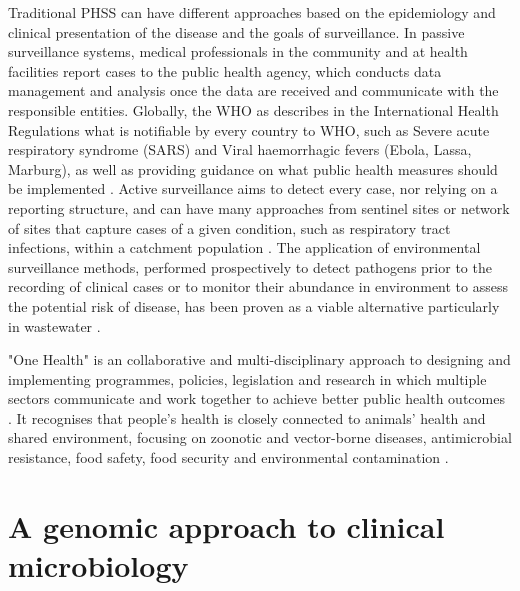 Traditional PHSS can have different approaches based on the epidemiology and clinical presentation of the disease and the goals of surveillance. In passive surveillance systems, medical professionals in the community and at health facilities report cases to the public health agency, which conducts data management and analysis once the data are received and communicate with the responsible entities. Globally, the WHO as describes in the International Health Regulations what is notifiable by every country to WHO, such as Severe acute respiratory syndrome (SARS) and Viral haemorrhagic fevers
(Ebola, Lassa, Marburg), as well as providing guidance on what public health measures should be implemented \citep{world_health_organization_international_2005}. Active surveillance aims to detect every case, nor relying on a reporting structure, and can have many approaches from sentinel sites or network of sites that capture cases of a given condition, such as respiratory tract infections, within a catchment population \citep{murray_infectious_2017, melo-cristino_estudo_2006}. The application of environmental surveillance methods, performed prospectively to detect pathogens prior to the recording of clinical cases or to monitor their abundance in environment to assess the potential risk of disease, has been proven as a viable alternative particularly in wastewater \citep{andrews_environmental_2020, mcweeney_demonstration_1894, baker_combined_2011, larsen_tracking_2020}.  

"One Health" is an collaborative and multi-disciplinary approach to designing and implementing programmes, policies, legislation and research in which multiple sectors communicate and work together to achieve better public health outcomes \citep{mackenzie_one_2019}. It recognises that people’s health is closely connected to animals’ health and shared environment, focusing on zoonotic and vector-borne diseases, antimicrobial resistance, food safety, food security and environmental contamination \citep{rugarabamu_one-health_2021}.


\section{A genomic approach to clinical microbiology} \label{sec:genomics_approach}

